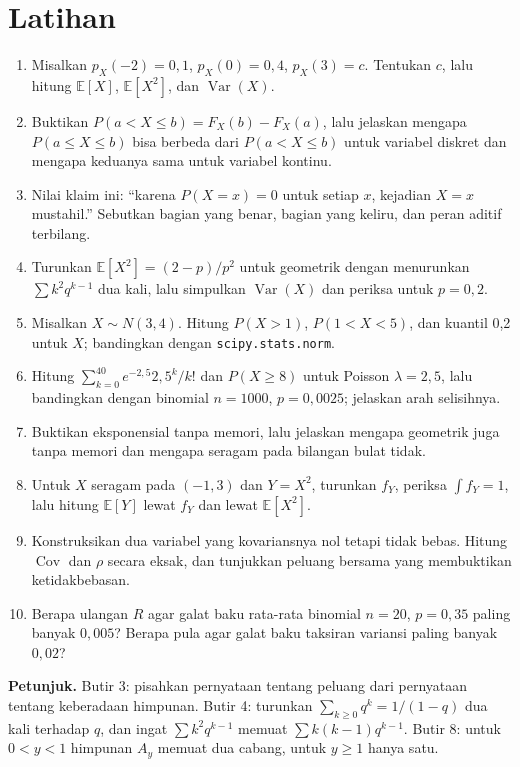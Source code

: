\section{Latihan}

\begin{latihan}
\begin{enumerate}
  \item Misalkan $p_X(-2)=0{,}1$, $p_X(0)=0{,}4$, $p_X(3)=c$. Tentukan $c$, lalu
        hitung $\mathbb{E}[X]$, $\mathbb{E}[X^2]$, dan $\operatorname{Var}(X)$.
  \item Buktikan $P(a<X\le b)=F_X(b)-F_X(a)$, lalu jelaskan mengapa
        $P(a\le X\le b)$ bisa berbeda dari $P(a<X\le b)$ untuk variabel diskret dan
        mengapa keduanya sama untuk variabel kontinu.
  \item Nilai klaim ini: ``karena $P(X=x)=0$ untuk setiap $x$, kejadian $X=x$
        mustahil.'' Sebutkan bagian yang benar, bagian yang keliru, dan peran aditif
        terbilang.
  \item Turunkan $\mathbb{E}[X^2]=(2-p)/p^2$ untuk geometrik dengan menurunkan
        $\sum k^2q^{k-1}$ dua kali, lalu simpulkan $\operatorname{Var}(X)$ dan periksa
        untuk $p=0{,}2$.
  \item Misalkan $X\sim N(3,4)$. Hitung $P(X>1)$, $P(1<X<5)$, dan kuantil 0,2 untuk
        $X$; bandingkan dengan \texttt{scipy.stats.norm}.
  \item Hitung $\sum_{k=0}^{40}e^{-2{,}5}2{,}5^k/k!$ dan $P(X\ge8)$ untuk Poisson
        $\lambda=2{,}5$, lalu bandingkan dengan binomial $n=1000$, $p=0{,}0025$;
        jelaskan arah selisihnya.
  \item Buktikan eksponensial tanpa memori, lalu jelaskan mengapa geometrik juga tanpa
        memori dan mengapa seragam pada bilangan bulat tidak.
  \item Untuk $X$ seragam pada $(-1,3)$ dan $Y=X^2$, turunkan $f_Y$, periksa
        $\int f_Y=1$, lalu hitung $\mathbb{E}[Y]$ lewat $f_Y$ dan lewat
        $\mathbb{E}[X^2]$.
  \item Konstruksikan dua variabel yang kovariansnya nol tetapi tidak bebas. Hitung
        $\operatorname{Cov}$ dan $\rho$ secara eksak, dan tunjukkan peluang bersama
        yang membuktikan ketidakbebasan.
  \item Berapa ulangan $R$ agar galat baku rata-rata binomial $n=20$, $p=0{,}35$
        paling banyak $0{,}005$? Berapa pula agar galat baku taksiran variansi paling
        banyak $0{,}02$?
\end{enumerate}

\noindent\textbf{Petunjuk.} Butir 3: pisahkan pernyataan tentang peluang dari
pernyataan tentang keberadaan himpunan. Butir 4: turunkan $\sum_{k\ge0}q^k=1/(1-q)$
dua kali terhadap $q$, dan ingat $\sum k^2q^{k-1}$ memuat $\sum k(k-1)q^{k-1}$.
Butir 8: untuk $0<y<1$ himpunan $A_y$ memuat dua cabang, untuk $y\ge1$ hanya satu.
\end{latihan}

